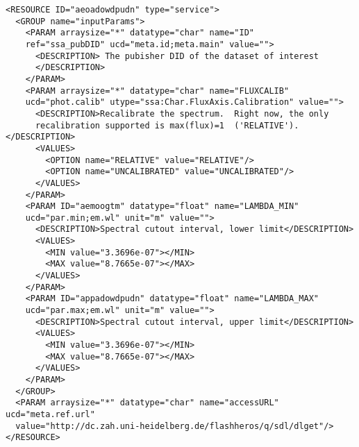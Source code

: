 \documentclass[final,authoryear,5p,times,twocolumn]{elsarticle}
\begin{document}
\begin{itemize}
{\tiny
\begin{minipage}{\textwidth} 
\begin{verbatim}
<RESOURCE ID="aeoadowdpudn" type="service">
  <GROUP name="inputParams">
    <PARAM arraysize="*" datatype="char" name="ID" 
    ref="ssa_pubDID" ucd="meta.id;meta.main" value="">
      <DESCRIPTION> The pubisher DID of the dataset of interest
      </DESCRIPTION>
    </PARAM>
    <PARAM arraysize="*" datatype="char" name="FLUXCALIB" 
    ucd="phot.calib" utype="ssa:Char.FluxAxis.Calibration" value="">
      <DESCRIPTION>Recalibrate the spectrum.  Right now, the only 
      recalibration supported is max(flux)=1  ('RELATIVE').</DESCRIPTION>
      <VALUES>
        <OPTION name="RELATIVE" value="RELATIVE"/>
        <OPTION name="UNCALIBRATED" value="UNCALIBRATED"/>
      </VALUES>
    </PARAM>
    <PARAM ID="aemoogtm" datatype="float" name="LAMBDA_MIN"
    ucd="par.min;em.wl" unit="m" value="">
      <DESCRIPTION>Spectral cutout interval, lower limit</DESCRIPTION>
      <VALUES>
        <MIN value="3.3696e-07"></MIN>
        <MAX value="8.7665e-07"></MAX>
      </VALUES>
    </PARAM>
    <PARAM ID="appadowdpudn" datatype="float" name="LAMBDA_MAX" 
    ucd="par.max;em.wl" unit="m" value="">
      <DESCRIPTION>Spectral cutout interval, upper limit</DESCRIPTION>
      <VALUES>
        <MIN value="3.3696e-07"></MIN>
        <MAX value="8.7665e-07"></MAX>
      </VALUES>
    </PARAM>
  </GROUP>
  <PARAM arraysize="*" datatype="char" name="accessURL" ucd="meta.ref.url" 
  value="http://dc.zah.uni-heidelberg.de/flashheros/q/sdl/dlget"/>
</RESOURCE>
\end{verbatim}


\end{minipage}}
\end{itemize}
\end{document}
